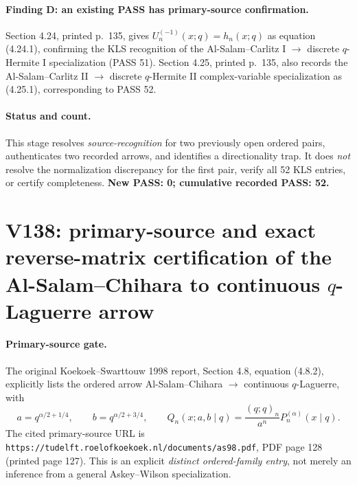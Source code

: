 \documentclass[11pt]{article}
\begin{document}
\paragraph{Finding D: an existing PASS has primary-source confirmation.}
Section 4.24, printed p.~135, gives
$U_n^{(-1)}(x;q)=h_n(x;q)$ as equation (4.24.1), confirming the KLS recognition of the Al-Salam--Carlitz I $\longrightarrow$ discrete $q$-Hermite I specialization (PASS 51). Section 4.25, printed p.~135, also records the Al-Salam--Carlitz II $\longrightarrow$ discrete $q$-Hermite II complex-variable specialization as (4.25.1), corresponding to PASS 52.

\paragraph{Status and count.}
This stage resolves \emph{source-recognition} for two previously open ordered pairs, authenticates two recorded arrows, and identifies a directionality trap. It does \emph{not} resolve the normalization discrepancy for the first pair, verify all 52 KLS entries, or certify completeness. \textbf{New PASS: 0; cumulative recorded PASS: 52.}


\clearpage
\section{V138: primary-source and exact reverse-matrix certification of the Al-Salam--Chihara to continuous $q$-Laguerre arrow}
\label{sec:v138-asc-lag-certified}
\paragraph{Primary-source gate.}
The original Koekoek--Swarttouw 1998 report, Section 4.8, equation (4.8.2), explicitly lists the ordered arrow
Al-Salam--Chihara $\longrightarrow$ continuous $q$-Laguerre, with
\[
 a=q^{\alpha/2+1/4},\qquad b=q^{\alpha/2+3/4},\qquad
 Q_n(x;a,b\mid q)=\frac{(q;q)_n}{a^n}P_n^{(\alpha)}(x\mid q).
\]
The cited primary-source URL is
\texttt{https://tudelft.roelofkoekoek.nl/documents/as98.pdf},
PDF page 128 (printed page 127). This is an explicit \emph{distinct ordered-family entry}, not merely an inference from a general Askey--Wilson specialization.
\end{document}
